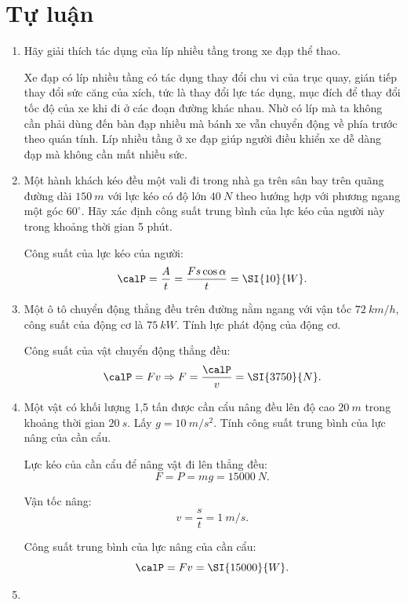 \section{Tự luận}
\begin{enumerate}[label=\bfseries Câu \arabic*:]
	\item {}
	
	
	{
		Hãy giải thích tác dụng của líp nhiều tầng trong xe đạp thể thao.
	}
	
	\hideall
	{	
		Xe đạp có líp nhiều tầng có tác dụng thay đổi chu vi của trục quay, gián tiếp thay đổi sức căng của xích, tức là thay đổi lực tác dụng, mục đích để thay đổi tốc độ của xe khi đi ở các đoạn đường khác nhau. Nhờ có líp mà ta không cần phải dùng đến bàn đạp nhiều mà bánh xe vẫn chuyển động về phía trước theo quán tính. Líp nhiều tầng ở xe đạp giúp người điều khiển xe dễ dàng đạp mà không cần mất nhiều sức. 
	}
	\item {}
	
	
	{
			Một hành khách kéo đều một vali đi trong nhà ga trên sân bay trên quãng đường dài $\SI{150}{m}$ với lực kéo có độ lớn $\SI{40}{N}$ theo hướng hợp với phương ngang một góc $60^\circ$. Hãy xác định công suất trung bình của lực kéo của người này trong khoảng thời gian 5 phút.
	}
	
	\hideall
	{	
		Công suất của lực kéo của người:
		$$\calP = \dfrac{A}{t} = \dfrac{Fs\cos \alpha}{t}= \SI{10}{W}.$$
	}
	\item {}
	
	
	{
		Một ô tô chuyển động thẳng đều trên đường nằm ngang với vận tốc $\SI{72}{km/h}$, công suất của động cơ là $\SI{75}{kW}$. Tính lực phát động của động cơ.
	}
	
	\hideall
	{	
		Công suất của vật chuyển động thẳng đều:
		$$\calP = Fv \Rightarrow F = \dfrac{\calP}{v} = \SI{3750}{N}.$$
	}
	\item {}
	
	
	{
		Một vật có khối lượng 1,5 tấn được cần cẩu nâng đều lên độ cao $\SI{20}{m}$ trong khoảng thời gian $\SI{20}{s}$. Lấy $g=\SI{10}{m/s^2}$. Tính công suất trung bình của lực nâng của cần cẩu.
	}
	
	\hideall
	{	
		Lực kéo của cần cẩu để nâng vật đi lên thẳng đều:
		$$F=P=mg=\SI{15000}{N}.$$
		
		Vận tốc nâng:
		$$v=\dfrac{s}{t} = \SI{1}{m/s}.$$
		
		Công suất trung bình của lực nâng của cần cẩu:
		$$\calP = Fv = \SI{15000}{W}.$$
	}
	\item {}
	

\end{enumerate}
